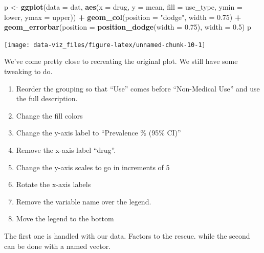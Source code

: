 \documentclass[]{book}
\newenvironment{Shaded}{\begin{snugshade}}{\end{snugshade}}
\newcommand{\KeywordTok}[1]{\textcolor[rgb]{0.13,0.29,0.53}{\textbf{#1}}}
\newcommand{\DataTypeTok}[1]{\textcolor[rgb]{0.13,0.29,0.53}{#1}}
\newcommand{\FloatTok}[1]{\textcolor[rgb]{0.00,0.00,0.81}{#1}}
\newcommand{\StringTok}[1]{\textcolor[rgb]{0.31,0.60,0.02}{#1}}
\newcommand{\OperatorTok}[1]{\textcolor[rgb]{0.81,0.36,0.00}{\textbf{#1}}}
\newcommand{\NormalTok}[1]{#1}
\providecommand{\tightlist}{%
  \setlength{\itemsep}{0pt}\setlength{\parskip}{0pt}}
\theoremstyle{definition}
\theoremstyle{definition}
\theoremstyle{definition}
\theoremstyle{remark}
\begin{document}
\begin{Shaded}
\begin{Highlighting}[]
\NormalTok{p <-}\StringTok{ }\KeywordTok{ggplot}\NormalTok{(}\DataTypeTok{data =}\NormalTok{ dat, }\KeywordTok{aes}\NormalTok{(}\DataTypeTok{x =}\NormalTok{ drug, }\DataTypeTok{y =}\NormalTok{ mean, }\DataTypeTok{fill =}\NormalTok{ use_type, }\DataTypeTok{ymin =}\NormalTok{ lower, }\DataTypeTok{ymax =}\NormalTok{ upper)) }\OperatorTok{+}
\StringTok{  }\KeywordTok{geom_col}\NormalTok{(}\DataTypeTok{position =} \StringTok{"dodge"}\NormalTok{, }\DataTypeTok{width =} \FloatTok{0.75}\NormalTok{) }\OperatorTok{+}
\StringTok{  }\KeywordTok{geom_errorbar}\NormalTok{(}\DataTypeTok{position =} \KeywordTok{position_dodge}\NormalTok{(}\DataTypeTok{width =} \FloatTok{0.75}\NormalTok{), }\DataTypeTok{width =} \FloatTok{0.5}\NormalTok{)}
\NormalTok{p}
\end{Highlighting}
\end{Shaded}

\begin{center}\texttt{[image: data-viz\_files/figure-latex/unnamed-chunk-10-1]} \end{center}

We've come pretty close to recreating the original plot. We still have
some tweaking to do.

\begin{enumerate}
\def\labelenumi{\arabic{enumi}.}
\tightlist
\item
  Reorder the grouping so that ``Use'' comes before ``Non-Medical Use''
  and use the full description.
\item
  Change the fill colors
\item
  Change the y-axis label to ``Prevalence \% (95\% CI)''
\item
  Remove the x-axis label ``drug''.
\item
  Change the y-axis scales to go in increments of 5
\item
  Rotate the x-axis labels
\item
  Remove the variable name over the legend.
\item
  Move the legend to the bottom
\end{enumerate}

The first one is handled with our data. Factors to the rescue. while the
second can be done with a named vector.
\end{document}
